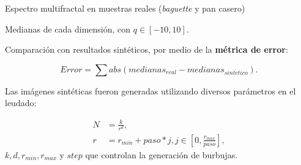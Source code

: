 \documentclass[spanish,unknownkeysallowed,10pt]{beamer}
\begin{document}










\begin{frame}
Espectro multifractal en muestras reales ({\em baguette} y pan casero)

Medianas de cada dimensión, con $q \in [-10,10]$.

Comparación con resultados sintéticos, por medio de la \textbf{métrica de error}:

\begin{equation*}
Error = \displaystyle \sum abs(medianas_{real}-medianas_{sint\acute{e}tico}).
\end{equation*}

Las imágenes sintéticas fueron generadas utilizando diversos parámetros en el leudado:

\begin{align*}
N &= \frac{k}{r^{d}},\\ r &= r_{min}+paso*j, j \in [0,\frac{r_{max}}{paso}],
\end{align*}
\noindent $k,d,r_{min},r_{max}$ y $step$ que controlan la generación de burbujas.

\end{frame}
\end{document}

